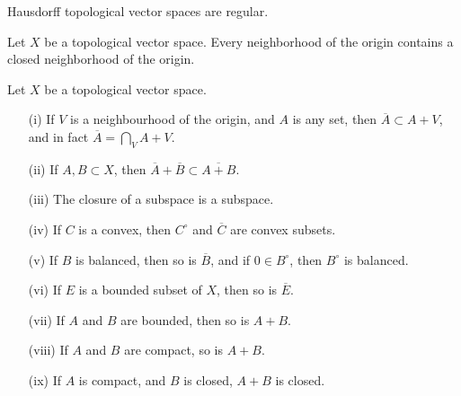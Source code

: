 \begin{corollary}
    Hausdorff topological vector spaces are regular.
\end{corollary}

\begin{corollary}
    Let $X$ be a topological vector space. Every neighborhood of the origin contains a closed neighborhood of the origin.
\end{corollary}

\begin{theorem}
    Let $X$ be a topological vector space.
    \begin{enumerate}
        \item[(i)] If $V$ is a neighbourhood of the origin, and $A$ is any set, then $\overline{A} \subset A + V$, and in fact $\overline{A} = \bigcap_V A + V$.
        \item[(ii)] If $A,B \subset X$, then $\overline{A} + \overline{B} \subset \overline{A + B}$.
        \item[(iii)] The closure of a subspace is a subspace.
        \item[(iv)] If $C$ is a convex, then $C^\circ$ and $\overline{C}$ are convex subsets.
        \item[(v)] If $B$ is balanced, then so is $\overline{B}$, and if $0 \in B^\circ$, then $B^\circ$ is balanced.
        \item[(vi)] If $E$ is a bounded subset of $X$, then so is $\overline{E}$.
        \item[(vii)] If $A$ and $B$ are bounded, then so is $A + B$.
        \item[(viii)] If $A$ and $B$ are compact, so is $A + B$.
        \item[(ix)] If $A$ is compact, and $B$ is closed, $A + B$ is closed.
    \end{enumerate}
\end{theorem}
